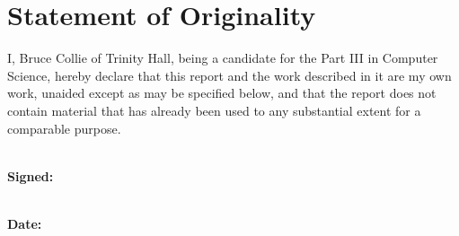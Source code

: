 \section*{Statement of Originality}

I, Bruce Collie of Trinity Hall, being a candidate for the Part III in Computer
Science, hereby declare that this report and the work described in it are my own
work, unaided except as may be specified below, and that the report does not
contain material that has already been used to any substantial extent for a
comparable purpose.

\vspace{0.5cm}

\noindent
\\\textbf{Signed:}

\vspace{0.5cm}

\noindent
\\\textbf{Date:}
